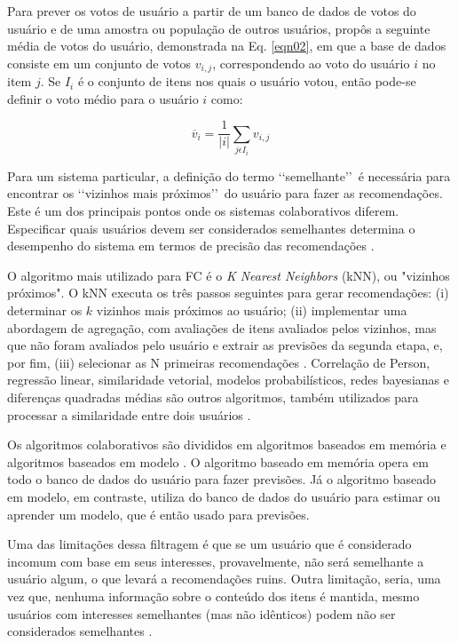 Para prever os votos de usuário a partir de um banco de dados de votos do usuário e de uma amostra ou população de outros usuários, 
 propôs a seguinte média de votos do usuário, demonstrada na  Eq. \ref{eqn02}, em que a base de dados 
consiste em um conjunto de votos $v_{i,j}$, correspondendo ao voto do usuário $i$ no item $j$. Se $I_{i}$ é o
conjunto de itens nos quais o usuário votou, então pode-se definir o voto médio para o usuário $i$ como:

\begin{equation}
	\label{eqn02}
\overline{v}_{i} = \frac{1}{\left | i \right |} \sum_{j\epsilon I_{i}}^{} v_{i,j}
\end{equation}


Para um sistema particular, a definição do termo \lq\lq semelhante\rq\rq\ é necessária para encontrar 
os \lq\lq vizinhos mais próximos\rq\rq\ do usuário para fazer as recomendações. Este é um dos principais 
pontos onde os sistemas colaborativos diferem. Especificar quais usuários devem ser considerados semelhantes determina o
desempenho do sistema em termos de precisão das recomendações \cite{son2017}.

O algoritmo mais utilizado para FC é o \emph{K Nearest Neighbors} (kNN), ou "vizinhos próximos". O kNN executa 
os três passos seguintes para gerar recomendações: (i) determinar os $k$ vizinhos mais próximos ao usuário; (ii) implementar 
uma abordagem de agregação, com avaliações de itens avaliados pelos vizinhos, mas que não foram avaliados pelo usuário e 
extrair as previsões da segunda etapa, e, por fim, (iii) selecionar as N primeiras recomendações \cite{bobadilla2013}. Correlação de Person, regressão linear, 
similaridade vetorial, modelos probabilísticos, redes bayesianas e diferenças quadradas médias são outros algoritmos, também utilizados para processar a similaridade entre dois usuários \cite{paulson2003}.

Os algoritmos colaborativos são divididos em algoritmos baseados em memória e algoritmos baseados em 
modelo \cite{breese2013}. O algoritmo baseado em memória opera em todo o banco de dados do usuário para fazer 
previsões. Já o algoritmo baseado em modelo, em contraste, utiliza do banco de dados do usuário 
para estimar ou aprender um modelo, que é então usado para previsões.

Uma das limitações dessa filtragem é que se um usuário que é considerado incomum com base em seus 
interesses, provavelmente, não será semelhante a usuário algum,
o que levará a recomendações ruins. Outra limitação, seria, uma vez que, nenhuma informação sobre o 
conteúdo dos itens é mantida, mesmo usuários com interesses semelhantes (mas não 
idênticos) podem não ser considerados semelhantes \cite{son2017}.

